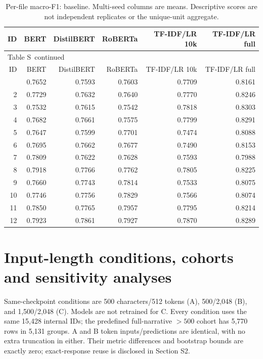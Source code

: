 \documentclass[10pt,a4paper]{article}
\renewcommand{\thetable}{S\arabic{table}}
\begin{document}
{\footnotesize
\setlength{\tabcolsep}{4pt}
\begin{longtable}{@{}rrrrrr@{}}
\caption{Per-file macro-F1: baseline. Multi-seed columns are means. Descriptive scores are not independent replicates or the unique-unit aggregate.}\label{sup:legacy-baseline}\\
\toprule
ID & BERT & DistilBERT & RoBERTa & TF-IDF/LR 10k & TF-IDF/LR full \\
\midrule\endfirsthead
\multicolumn{6}{l}{\small Table \thetable\ continued}\\
\toprule
ID & BERT & DistilBERT & RoBERTa & TF-IDF/LR 10k & TF-IDF/LR full \\
\midrule\endhead
\bottomrule\endfoot
1 & 0.7652 & 0.7593 & 0.7603 & 0.7709 & 0.8161 \\
2 & 0.7729 & 0.7632 & 0.7640 & 0.7770 & 0.8246 \\
3 & 0.7532 & 0.7615 & 0.7542 & 0.7818 & 0.8303 \\
4 & 0.7682 & 0.7661 & 0.7575 & 0.7799 & 0.8291 \\
5 & 0.7647 & 0.7599 & 0.7701 & 0.7474 & 0.8088 \\
6 & 0.7695 & 0.7662 & 0.7677 & 0.7490 & 0.8153 \\
7 & 0.7809 & 0.7622 & 0.7628 & 0.7593 & 0.7988 \\
8 & 0.7918 & 0.7766 & 0.7762 & 0.7805 & 0.8225 \\
9 & 0.7660 & 0.7743 & 0.7814 & 0.7533 & 0.8075 \\
10 & 0.7746 & 0.7756 & 0.7829 & 0.7566 & 0.8074 \\
11 & 0.7850 & 0.7765 & 0.7957 & 0.7795 & 0.8214 \\
12 & 0.7923 & 0.7861 & 0.7927 & 0.7870 & 0.8289 \\
\end{longtable}
}


\section{Input-length conditions, cohorts and sensitivity analyses}\label{sup:length}


Same-checkpoint conditions are 500 characters/512 tokens (A), 500/2,048 (B), and 1,500/2,048 (C). Models are not retrained for C. Every condition uses the same 15,428 internal IDs; the predefined full-narrative $>500$ cohort has 5,770 rows in 5,131 groups. A and B token inputs/predictions are identical, with no extra truncation in either. Their metric differences and bootstrap bounds are exactly zero; exact-response reuse is disclosed in Section S2.
\end{document}
